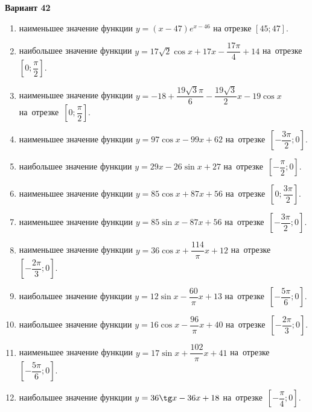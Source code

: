 \documentclass[a4paper,10pt]{article}
\begin{document}
\begin{center}\Large\textbf{Вариант 42}\end{center}

\begin{enumerate}
\item {} наименьшее значение функции $y = \left(x-47\right)e^{x-46}$ на отрезке $\left[45;47\right]$.

\item {} наибольшее значение функции $y = 17\sqrt{2}\cos x+17x-\dfrac{17\pi}{4} +14$ на~отрезке~$\left[0;\dfrac{\pi }{2}\right]$.

\item {} наименьшее значение функции $y = -18+\dfrac{19\sqrt{3} \pi}{6}-\dfrac{19\sqrt{3}}{2}x-19\cos x$ на~отрезке~$\left[0;\dfrac{\pi }{2}\right]$.

\item {} наименьшее значение функции $y = 97\cos x-99x+62$ на~отрезке~$\left[-\dfrac{3\pi }{2};0\right]$.

\item {} наибольшее значение функции $y = 29x-26\sin x+27$ на~отрезке~$\left[-\dfrac{\pi }{2};0\right]$.

\item {} наименьшее значение функции $y = 85\cos x+87x+56$ на~отрезке~$\left[0;\dfrac{3\pi }{2}\right]$.

\item {} наименьшее значение функции $y = 85\sin x-87x+56$ на~отрезке~$\left[-\dfrac{3\pi }{2};0\right]$.

\item {} наименьшее значение функции $y = 36\cos x+\dfrac{114}{\pi }x +12$ на~отрезке~$\left[-\dfrac{2\pi }{3};0\right]$.

\item {} наибольшее значение функции $y = 12\sin x-\dfrac{60}{\pi }x+13$ на~отрезке~$\left[-\dfrac{5\pi }{6};0\right]$.

\item {} наибольшее значение функции $y = 16\cos x-\dfrac{96}{\pi }x+40$ на~отрезке~$\left[-\dfrac{2\pi }{3};0\right]$.

\item {} наименьшее значение функции $y = 17\sin x+\dfrac{102}{\pi }x+41$ на~отрезке~$\left[-\dfrac{5\pi }{6};0\right]$.

\item {} наибольшее значение функции $y = 36\tg x-36x+18$ на~отрезке~$\left[-\dfrac{\pi }{4};0\right]$.


\end{enumerate}
\end{document}
